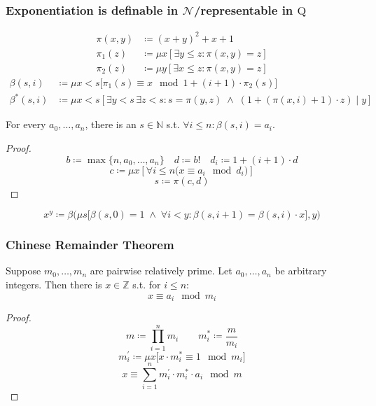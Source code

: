 \documentclass[UTF8,11pt,colorlinks,compress,openany]{beamer}%
\begin{document}
\begin{frame}\frametitle{Exponentiation is definable in $\mathcal{N}$/representable in $\mathrm{Q}$}\vspace{-2ex}
\setlength\abovedisplayskip{0pt}
\setlength\belowdisplayskip{0pt}
	\begin{align*}
	\pi(x,y)&\coloneqq (x+y)^2+x+1\\
	\pi_1(z)&\coloneqq \mu x[\exists y\leq z:\pi(x,y)=z]\\
	\pi_2(z)&\coloneqq \mu y[\exists x\leq z:\pi(x,y)=z]
	\end{align*}
	\begin{align*}
	\beta(s,i)&\coloneqq \mu x<s\big[\pi_1(s)\equiv x\mod 1+(i+1)\cdot \pi_2(s)\big]\\
	\beta^*(s,i)&\coloneqq \mu x<s\left[\exists y<s\,\exists z<s: s=\pi(y,z)\;\wedge\;(1+(\pi(x,i)+1)\cdot z)\mid y\right]
	\end{align*}
	\begin{lemma}
		For every $a_0,\dots,a_n$, there is an $s\in\mathbb{N}$ s.t. $\forall i\leq n:\beta(s,i)=a_i$.
	\end{lemma}
	\begin{proof}\vspace{-1ex}
		\[b\coloneqq \max\{n,a_0,\dots,a_n\}\quad d\coloneqq b!\quad d_i\coloneqq 1+(i+1)\cdot d\]
		\[c\coloneqq \mu x\left[\forall i\leq n\big(x\equiv a_i\mod d_i\big)\right]\]
		\[s\coloneqq \pi(c,d)\]\vspace{-3ex}
	\end{proof}\vspace{-2ex}
	\[x^y\coloneqq \beta\Big(\mu s\big[\beta(s,0)=1\;\wedge\;\forall i<y:\beta(s,i+1)=\beta(s,i)\cdot x\big],y\Big)\]
\end{frame}

\begin{frame}\frametitle{Chinese Remainder Theorem}
	\begin{theorem}
		Suppose $m_0,\dots,m_n$ are pairwise relatively prime. Let
		$a_0,\dots,a_n$ be arbitrary integers. Then there is $x\in\mathbb{Z}$ s.t. for $i\leq n:$
		\[x\equiv a_i\mod m_i\]
	\end{theorem}
	\begin{proof}
		\[m\coloneqq \prod\limits_{i=1}^n m_i\qquad m_i^*\coloneqq \frac{m}{m_i}\]
		\[m_i^\prime\coloneqq \mu x\big[x\cdot m_i^*\equiv 1\mod m_i\big]\]
		\[x\equiv\sum\limits_{i=1}^n m_i^\prime\cdot m_i^*\cdot a_i\mod m\]\vspace{-1ex}
	\end{proof}
\end{frame}
\end{document}
